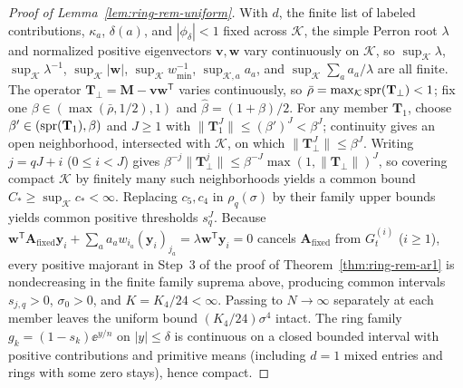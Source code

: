 \begin{proof}[Proof of Lemma~{\upshape\ref{lem:ring-rem-uniform}}]
With $d$, the finite list of labeled contributions, $\kappa_a$, $\delta(a)$, and $|\phi_\delta| < 1$ fixed across $\mathcal{K}$, the simple Perron root $\lambda$ and normalized positive eigenvectors $\mathbf{v}, \mathbf{w}$ vary continuously on $\mathcal{K}$, so $\sup_{\mathcal{K}} \lambda$, $\sup_{\mathcal{K}} \lambda^{-1}$, $\sup_{\mathcal{K}} |\mathbf{w}|$, $\sup_{\mathcal{K}} w_{\min}^{-1}$, $\sup_{\mathcal{K},a} a_a$, and $\sup_{\mathcal{K}} \sum_a a_a/\lambda$ are all finite. The operator $\mathbf{T}_\perp = \mathbf{M} - \mathbf{v}\mathbf{w}^{\mathsf{T}}$ varies continuously, so $\bar{\rho} = \max_{\mathcal{K}} \operatorname{spr}(\mathbf{T}_\perp) < 1$; fix one $\beta \in (\max(\bar{\rho}, 1/2), 1)$ and $\hat{\beta} = (1 + \beta)/2$. For any member $\mathbf{T}_1$, choose $\beta' \in (\operatorname{spr}(\mathbf{T}_1), \beta)$ and $J \ge 1$ with $\|\mathbf{T}_1^J\| \le (\beta')^J < \beta^J$; continuity gives an open neighborhood, intersected with $\mathcal{K}$, on which $\|\mathbf{T}_\perp^J\| \le \beta^J$. Writing $j = qJ + i$ ($0 \le i < J$) gives $\beta^{-j}\|\mathbf{T}_\perp^j\| \le \beta^{-J}\max(1, \|\mathbf{T}_\perp\|)^J$, so covering compact $\mathcal{K}$ by finitely many such neighborhoods yields a common bound $C_* \ge \sup_{\mathcal{K}} c_* < \infty$. Replacing $c_5, c_4$ in $\rho_q(\sigma)$ by their family upper bounds yields common positive thresholds $s_q^J$. Because $\mathbf{w}^{\mathsf{T}}\mathbf{A}_{\mathrm{fixed}}\mathbf{y}_i + \sum_a a_a w_{i_a}(\mathbf{y}_i)_{j_a} = \lambda\mathbf{w}^{\mathsf{T}}\mathbf{y}_i = 0$ cancels $\mathbf{A}_{\mathrm{fixed}}$ from $G_t^{(i)}$ ($i \ge 1$), every positive majorant in Step~3 of the proof of Theorem~\ref{thm:ring-rem-ar1} is nondecreasing in the finite family suprema above, producing common intervals $s_{j,q} > 0$, $\sigma_0 > 0$, and $K = K_4/24 < \infty$. Passing to $N \to \infty$ separately at each member leaves the uniform bound $(K_4/24)\sigma^4$ intact. The ring family $g_k = (1 - s_k)\ee^{y/n}$ on $|y| \le \delta$ is continuous on a closed bounded interval with positive contributions and primitive means (including $d = 1$ mixed entries and rings with some zero stays), hence compact.
\end{proof}

